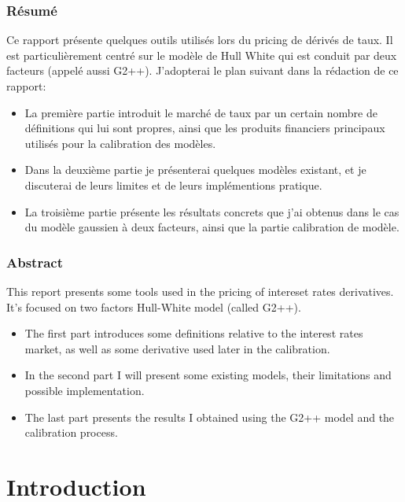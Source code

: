 

\newpage

\subsection*{Résumé}
  
  Ce rapport présente quelques outils utilisés lors du pricing de dérivés de taux. 
  Il est particulièrement centré sur le modèle de Hull White qui est conduit par deux facteurs (appelé aussi G2++).  J'adopterai le plan suivant dans la rédaction de ce rapport:
  \begin{itemize}
  \item 
    La première partie introduit le marché de taux par un certain nombre de définitions qui lui sont propres, ainsi que les produits financiers principaux utilisés pour la calibration des modèles.
  \item 
    Dans la deuxième partie je présenterai quelques modèles existant, et je discuterai de leurs limites et de leurs implémentions pratique.
  
  \item
    La troisième partie présente les résultats concrets que j'ai obtenus dans le cas du modèle gaussien à deux facteurs, ainsi que la partie calibration de modèle.
  \end{itemize}
  
\subsection*{Abstract} 
This report presents some tools used in the pricing of intereset rates derivatives. It's focused on two factors Hull-White model (called G2++).  
  \begin{itemize}
  \item
    The first part introduces some definitions relative to the interest rates market, as well as some derivative used later in the calibration.
  \item
    In the second part I will present some existing models, their limitations and possible implementation.

  \item
    The last part presents the results I obtained using the G2++ model and the calibration process.
  \end{itemize}




\newpage
\chapter*{Introduction}

